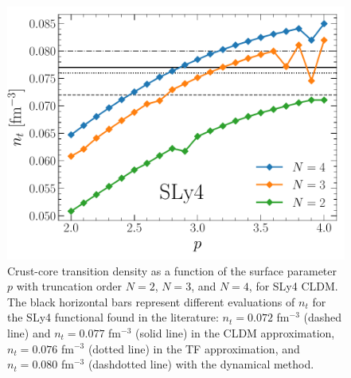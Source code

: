 \begin{figure}[!t]
\begin{center}
  \includegraphics[width=0.8\linewidth]{figures/sly4_nt.pdf}
\end{center}
\caption[Crust-core transition density versus surface parameter $p$ for SLy4]{Crust-core 
  transition density as a function of the surface parameter  
$p$ with truncation order $N=2$, $N=3$, and $N=4$, for SLy4 CLDM. The black
horizontal bars represent different evaluations of $n_t$ for the SLy4
functional found in the literature: $n_t=0.072$ fm$^{-3}$ \cite{Vinas2017}
(dashed line) and $n_t=0.077$ fm$^{-3}$ \cite{Douchin2000a} (solid line) in the
CLDM approximation, $n_t=0.076$ fm$^{-3}$ \cite{Vinas2017} (dotted line) in the
TF approximation, and $n_t=0.080$ fm$^{-3}$ \cite{Vinas2017} (dashdotted line)
with the dynamical method.}\label{fig:sly4_nt}
\end{figure}

